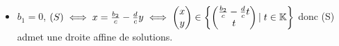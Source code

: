 \documentclass{article}
\renewenvironment{question_kholle}[2][ ]
{
	\subsection{\texorpdfstring{#2}{}}
	\notblank{#1}
	{
		\noindent #1
		\bigbreak
	}
	{}
	\begin{proof}
}
{
	\end{proof}
}
\begin{document}
\begin{question_kholle}
\begin{itemize}[label=$\bullet$ Supposons]
\begin{itemize}[label=$\bullet$ Si]
\begin{itemize}[label=$\bullet$ Si]
                    \item $b_1 = 0$, $(S) \iff x = \frac{b_2}{c} - \frac{d}{c}y \iff \begin{pmatrix} x \\ y \end{pmatrix} \in \begin{Bmatrix} \begin{pmatrix} \frac{b_2}{c} - \frac{d}{c}t \\ t \end{pmatrix} |\; t \in \mathbb K \end{Bmatrix}$ donc (S) admet une droite affine de solutions.
                  \end{itemize}
          \end{itemize}
  \end{itemize}

\end{question_kholle}
\end{document}
